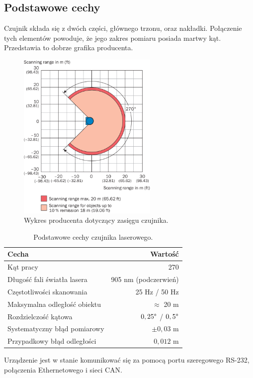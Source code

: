 	\subsection{Podstawowe cechy}
	Czujnik składa się z dwóch części, głównego trzonu, oraz nakładki.
	Połączenie tych elementów powoduje, że jego zakres pomiaru posiada martwy kąt.
	Przedstawia to dobrze grafika producenta.
	\begin{figure}[H]
	\centering
	\includegraphics[width=0.6\textwidth]{graphics/sick.png}
	\caption{Wykres producenta dotyczący zasięgu czujnika.}
	\label{fig:lidar}
	\end{figure} 
	
	\begin{table}
	\centering
	\begin{tabular}{l r}
	Cecha & Wartość \\
	\hline
	Kąt pracy & 270\textdegree \\
	Długość fali światła lasera & 905 nm (podczerwień) \\
	Częstotliwości skanowania & 25 Hz / 50 Hz \\
	Maksymalna odległość obiektu & $\approx$ 20 m \\
	Rozdzielczość kątowa & $0,25 \degree$ / $0,5 \degree $ \\
	Systematyczny błąd pomiarowy & $\pm 0,03$ m \\
	Przypadkowy błąd odległości & $0,012$ m \\
	\end{tabular}
	\caption{Podstawowe cechy czujnika laserowego.}
	\label{tab:lidar}
	\end{table}
	Urządzenie jest w stanie komunikować się za pomocą portu szeregowego RS-232, połączenia Ethernetowego i sieci CAN.


